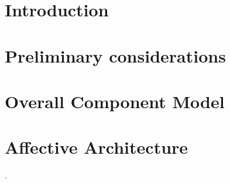 \documentclass[draft,final]{vutinfth}
\begin{document}
	\chapter{Introduction}
	
	
	
	\chapter{Preliminary considerations}\label{ch:relatedWork}
	
	
	
	\chapter{Overall Component Model}\label{ch:componentModel}
	
	
	\chapter{Affective Architecture}\label{ch:affectiveArchitecture}.
	
	
	
	
	
	
	
	
	
	
\end{document}
